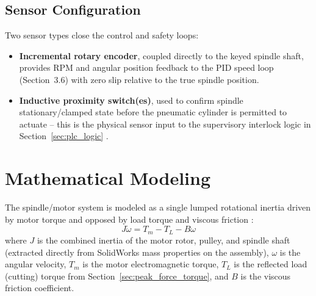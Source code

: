 \documentclass[12pt,a4paper]{report}
\begin{document}
	\subsection{Sensor Configuration}
	Two sensor types close the control and safety loops:
	\begin{itemize}
		\item \textbf{Incremental rotary encoder}, coupled directly to the keyed spindle
		shaft, provides RPM and angular position feedback to the PID speed loop
		(Section~3.6) with zero slip relative to the true spindle position.
		\item \textbf{Inductive proximity switch(es)}, used to confirm spindle
		stationary/clamped state before the pneumatic cylinder is permitted to actuate -- this
		is the physical sensor input to the supervisory interlock logic in Section~\ref{sec:plc_logic}
		\cite{ref14}.
	\end{itemize}
	
	\section{Mathematical Modeling}\label{sec:math_modeling}
	The spindle/motor system is modeled as a single lumped rotational inertia driven by motor
	torque and opposed by load torque and viscous friction \cite{ref8,ref9}:
	\begin{equation}
		J\dot{\omega} = T_m - T_L - B\omega
	\end{equation}
	where $J$ is the combined inertia of the motor rotor, pulley, and spindle shaft (extracted
	directly from SolidWorks mass properties on the assembly), $\omega$ is the angular velocity,
	$T_m$ is the motor electromagnetic torque, $T_L$ is the reflected load (cutting) torque from
	Section~\ref{sec:peak_force_torque}, and $B$ is the viscous friction coefficient.
	
\end{document}
